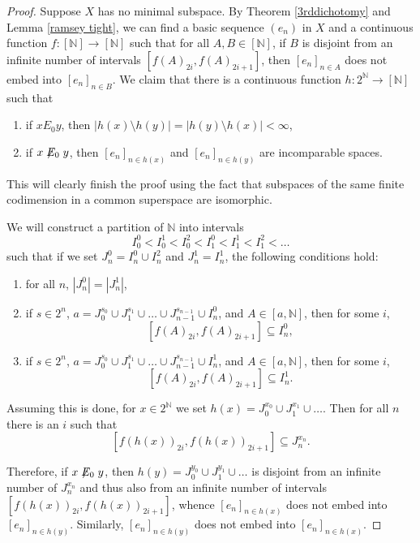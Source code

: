 \documentclass[10pt]{amsart}
\numberwithin{equation}{section}
\begin{document}
\begin{proof}Suppose $X$ has no minimal subspace.
By Theorem \ref{3rddichotomy} and Lemma \ref{ramsey tight}, we can find a basic
sequence $(e_n)$ in $X$ and a continuous function $f\colon [{\mathbb N}]{\rightarrow} [{\mathbb N}]$ such
that for all $A, B\in [{\mathbb N}]$, if $B$ is disjoint from an infinite number of
intervals $[f(A)_{2i},f(A)_{2i+1}]$, then $[e_n]_{n\in A}$ does not embed into
$[e_n]_{n\in B}$. We claim that there is a continuous function $h\colon {{2^{\mathbb N}}}{\rightarrow}
[{\mathbb N}]$ such that
\begin{enumerate}
  \item if $xE_0y$, then $|h(x)\setminus h(y)|=|h(y)\setminus h(x)|<\infty$,
  \item if $x\not\mathrel{E_0}y$, then $[e_n]_{n\in h(x)}$ and $[e_n]_{n\in h(y)}$ are incomparable spaces.
\end{enumerate}
This will clearly finish the proof using the fact that subspaces of the same
finite codimension in a common superspace are isomorphic.

We will construct a partition of ${\mathbb N}$ into intervals
$$
I_0^0<I_0^1<I_0^2<I_1^0<I_1^1<I_1^2<\ldots
$$
such that if we set $J_n^0=I_n^0\cup I_n^2$ and $J_n^1=I_n^1$, the following
conditions hold:
\begin{enumerate}
  \item for all $n$, $|J_n^0|=|J_n^1|$,
  \item if $s\in 2^n$, $a=J_0^{s_0}\cup J_1^{s_1}\cup\ldots \cup J_{n-1}^{s_{n-1}}\cup I_n^0$, and $A\in [a,{\mathbb N}]$, then for some $i$,
$$
[f(A)_{2i},f(A)_{2i+1}]\subseteq I_n^0,
$$
  \item if $s\in 2^n$, $a=J_0^{s_0}\cup J_1^{s_1}\cup\ldots \cup J_{n-1}^{s_{n-1}}\cup I_n^1$, and $A\in [a,{\mathbb N}]$, then for some $i$,
$$
[f(A)_{2i},f(A)_{2i+1}]\subseteq I_n^1.
$$
\end{enumerate}
Assuming this is done, for $x\in {{2^{\mathbb N}}}$ we set  $h(x)=J_0^{x_0}\cup
J_1^{x_1}\cup\ldots$. Then for all $n$ there is an $i$ such that
$$
[f(h(x))_{2i},f(h(x))_{2i+1}]\subseteq J_n^{x_n}.
$$

Therefore, if $x\not\mathrel{E_0}y$, then $h(y)=J_0^{y_0}\cup
J_1^{y_1}\cup\ldots$ is disjoint from an infinite number of $J^{x_n}_n$ and
thus also from an infinite number of intervals $[f(h(x))_{2i},f(h(x))_{2i+1}]$,
whence $[e_n]_{n\in h(x)}$ does not embed into $[e_n]_{n\in h(y)}$. Similarly,
$[e_n]_{n\in h(y)}$ does not embed into $[e_n]_{n\in h(x)}$.


\end{proof}
\end{document}
